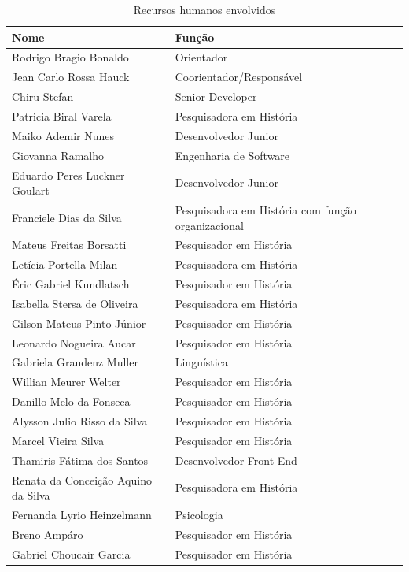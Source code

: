 \begin{table}[htbp]
  \small
  \caption{Recursos humanos envolvidos}           %
  \label{tab:rh}
  \centering
  \begin{tabularx}{\linewidth}{@{}>{\RaggedRight\arraybackslash}p{5.5cm}
                                    >{\RaggedRight\arraybackslash}X@{}}
    \toprule
    Nome & Função \\ \midrule
    Rodrigo Bragio Bonaldo & Orientador \\
    Jean Carlo Rossa Hauck & Coorientador/Responsável \\
    Chiru Stefan & Senior Developer \\
    Patricia Biral Varela & Pesquisadora em História \\
    Maiko Ademir Nunes & Desenvolvedor Junior \\
    Giovanna Ramalho & Engenharia de Software \\
    Eduardo Peres Luckner Goulart & Desenvolvedor Junior \\
    Franciele Dias da Silva & Pesquisadora em História com função
    organizacional \\
    Mateus Freitas Borsatti & Pesquisador em História \\
    Letícia Portella Milan & Pesquisadora em História \\
    Éric Gabriel Kundlatsch & Pesquisador em História \\
    Isabella Stersa de Oliveira & Pesquisadora em História \\
    Gilson Mateus Pinto Júnior & Pesquisador em História \\
    Leonardo Nogueira Aucar & Pesquisador em História \\
    Gabriela Graudenz Muller & Linguística \\
    Willian Meurer Welter & Pesquisador em História \\
    Danillo Melo da Fonseca & Pesquisador em História \\
    Alysson Julio Risso da Silva & Pesquisador em História \\
    Marcel Vieira Silva & Pesquisador em História \\
    Thamiris Fátima dos Santos & Desenvolvedor Front-End \\
    Renata da Conceição Aquino da Silva & Pesquisadora em História \\
    Fernanda Lyrio Heinzelmann & Psicologia \\
    Breno Ampáro & Pesquisador em História \\
    Gabriel Choucair Garcia & Pesquisador em História \\ \bottomrule
  \end{tabularx}
\end{table}

